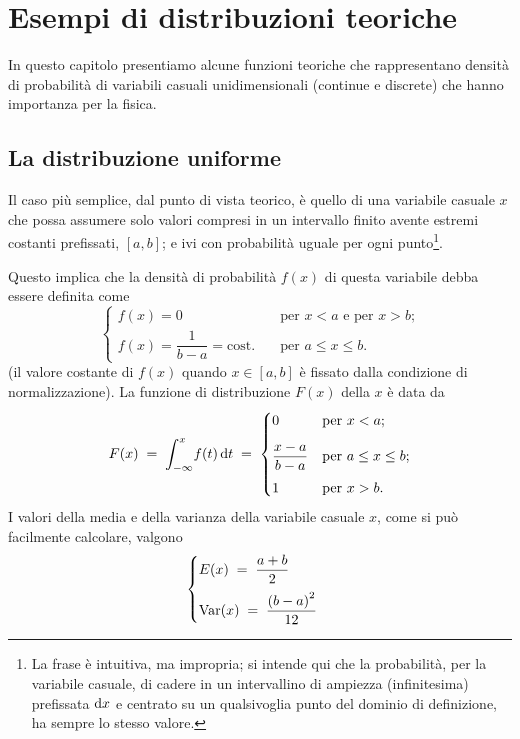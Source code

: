 
\chapter{Esempi di distribuzioni teoriche}
In questo capitolo presentiamo alcune funzioni teoriche che
rappresentano densit\`a di probabilit\`a di variabili
casuali unidimensionali (continue e discrete) che hanno
importanza per la fisica.

\section{La distribuzione uniforme}%
%
\label{ch:8.distun}
Il caso pi\`u semplice, dal punto di vista teorico, \`e
quello di una variabile casuale $x$ che possa assumere solo
valori compresi in un intervallo finito avente estremi
costanti prefissati, $[ a, b ]$; e ivi con probabilit\`a
uguale per ogni punto\/\footnote{La frase \`e intuitiva, ma
  impropria; si intende qui che la probabilit\`a, per la
  variabile casuale, di cadere in un intervallino di
  ampiezza (infinitesima) prefissata $\mathrm{d} x$ e centrato su
  un qualsivoglia punto del dominio di definizione, ha
  sempre lo stesso valore.}.

Questo implica che la densit\`a di probabilit\`a $f(x)$ di
questa variabile debba essere definita come
\begin{equation*}
  \begin{cases}
    f(x) = 0 & \quad\text{per $x<a$ e per $x>b$;}
      \\[1.5ex]
    f(x) = \dfrac{1}{b-a} = \mathrm{cost.} &
      \quad\text{per $a \leq x \leq b$.}
  \end{cases}
\end{equation*}
(il valore costante di $f(x)$ quando $x \in [ a, b ]$ \`e
fissato dalla condizione di normalizzazione).  La funzione
di distribuzione $F(x)$ della $x$ \`e data da
\begin{equation*}
  F(x) \; = \; \int_{-\infty}^x \! f(t) \, \mathrm{d} t \; =
  \;
  \begin{cases}
    0 & \text{per $x<a$;} \\[2ex]
    \dfrac{x-a}{b-a} & \text{per $a \leq x \leq b$;}
    \\[2ex]
    1 & \text{per $x>b$.}
  \end{cases}
\end{equation*}
I valori della media e della varianza della variabile
casuale $x$, come si pu\`o facilmente calcolare, valgono
\begin{equation} \label{eq:8.mevaun}
  \begin{cases}
    E(x) \; = \; \dfrac{a+b}{2} \\[2ex]
    \operatorname{Var}(x) \; = \; \dfrac{\left( b-a \right)^2}{12}
    \end{cases}
\end{equation}%


